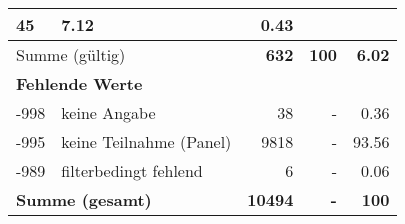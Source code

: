 \begin{longtable}{lXrrr}
       \num{45} &
       \num[round-mode=places,round-precision=2]{7.12} &
         \num[round-mode=places,round-precision=2]{0.43} \\
     \midrule
     \multicolumn{2}{l}{Summe (gültig)} &
       \textbf{\num{632}} &
     \textbf{\num{100}} &
       \textbf{\num[round-mode=places,round-precision=2]{6.02}} \\
     \multicolumn{5}{l}{\textbf{Fehlende Werte}}\\
       -998 &
       keine Angabe &
         \num{38} &
        - &
         \num[round-mode=places,round-precision=2]{0.36} \\
       -995 &
       keine Teilnahme (Panel) &
         \num{9818} &
        - &
         \num[round-mode=places,round-precision=2]{93.56} \\
       -989 &
       filterbedingt fehlend &
         \num{6} &
        - &
         \num[round-mode=places,round-precision=2]{0.06} \\
     \midrule
     \multicolumn{2}{l}{\textbf{Summe (gesamt)}} &
          \textbf{\num{10494}} &
        \textbf{-} &
        \textbf{\num{100}} \\
     \bottomrule
     \end{longtable}
     

